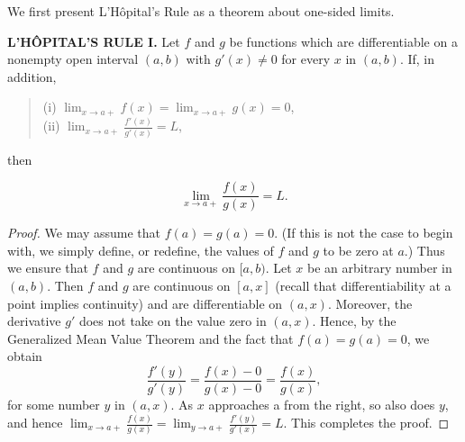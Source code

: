 We first present L'H\^{o}pital's Rule as a theorem about one-sided limits.

\begin{theorem} %
\textbf{L'H\^{O}PITAL'S RULE I.}  Let $f$ and $g$ be functions which are differentiable on a nonempty open interval $(a, b)$ with $g'(x) \neq 0$ for every $x$ in $(a, b)$. If, in addition,
 
\begin{quote}
\begin{description}
\item[(i) $\lim_{x \rightarrow a+} f(x) = \lim_{x \rightarrow a+} g(x)= 0$,] 
\item[(ii) $\lim_{x \rightarrow a+} \frac{f'(x)}{g'(x)} = L$,]

\end{description}
\end{quote} 

\noindent then

$$
\lim_{x \rightarrow a+}\frac{f(x)}{g(x)} = L.
$$
\end{theorem}

\begin{proof}
We may assume that $f(a) = g(a) = 0$. (If this is not the case to begin with, we simply define, or redefine, the values of $f$ and $g$ to be zero at $a$.) Thus we ensure that $f$ and $g$ are continuous on $[a, b)$. Let $x$ be an arbitrary number in $(a, b)$. Then $f$ and $g$ are continuous on $[a, x]$ (recall that differentiability at a point implies continuity) and are differentiable on $(a, x)$. Moreover, the derivative $g'$ does not take on the value zero in $(a, x)$. Hence, by the Generalized Mean Value Theorem and the fact that $f(a) = g(a) = 0$, we obtain
$$
\frac{f'(y)}{g'(y)} = \frac{f(x) - 0}{g(x) - 0} = \frac{f(x)}{g(x)},  
$$
for some number $y$ in $(a, x)$. As $x$ approaches a from the right, so also does $y$, and hence $\lim_{x \rightarrow a+} \frac{f(x)}{g(x)} = \lim_{y \rightarrow a+}\frac{f'(y)}{g'(x)} = L$. This completes the proof. 
\end{proof}


